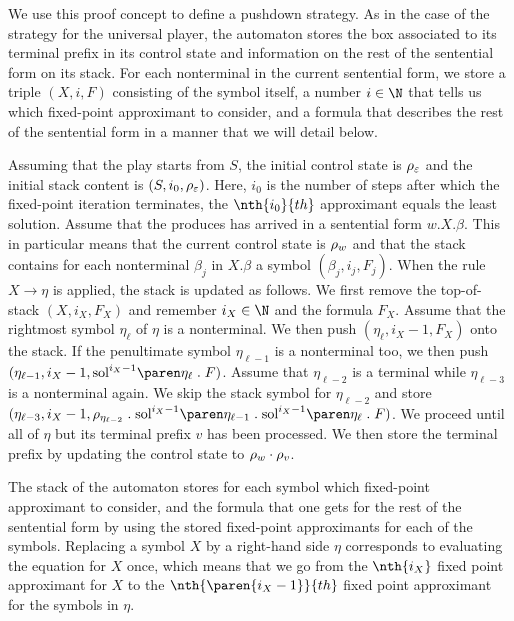 \documentclass[../../diss.tex]{subfiles}
\begin{document}
We use this proof concept to define a pushdown strategy.
As in the case of the strategy for the universal player, the automaton stores the box associated to its terminal prefix in its control state and information on the rest of the sentential form on its stack.
For each nonterminal in the current sentential form, we store a triple
\(
    (X, i, F)
\)
consisting of the symbol itself, a number $i \in \N$ that tells us which fixed-point approximant to consider, and a formula that describes the rest of the sentential form in a manner that we will detail below.

Assuming that the play starts from $S$, the initial control state is $\tbox{\eps}$ and the initial stack content is $(S,i_0,\tbox{\eps})$.
Here, $i_0$ is the number of steps after which the fixed-point iteration terminates, \ie the $\nth{i_0}{th}$ approximant equals the least solution.
Assume that the produces has arrived in a sentential form $w.X.\beta$.
This in particular means that the current control state is $\tbox{w}$ and that the stack contains for each nonterminal $\beta_j$ in $X.\beta$ a symbol $(\beta_j, i_j, F_j)$.
When the rule $X \to \eta$ is applied, the stack is updated as follows.
We first remove the top-of-stack $(X, i_X, F_X)$ and remember $i_X \in \N$ and the formula $F_X$.
Assume that the rightmost symbol $\eta_\ell$ of $\eta$ is a nonterminal.
We then push
$( \eta_\ell, i_X - 1, F_X)$ onto the stack.
If the penultimate symbol $\eta_{\ell - 1}$ is a nonterminal too, we then push
$( \eta_{\ell - 1}, i_X - 1, \sol{i_X - 1}{\eta_{\ell}} \comp F)$.
Assume that $\eta_{\ell - 2}$ is a terminal while $\eta_{\ell - 3}$ is a nonterminal again.
We skip the stack symbol for $\eta_{\ell - 2}$ and store
$( \eta_{\ell - 3}, i_X - 1, \tbox{\eta_{\ell - 2}} \comp \sol{i_X - 1}{\eta_{\ell - 1}} \comp \sol{i_X - 1}{\eta_{\ell}} \comp F)$.
We proceed until all of $\eta$ but its terminal prefix $v$ has been processed.
We then store the terminal prefix by updating the control state to $\tbox{w} \relcomp \tbox{v}$.

The stack of the automaton stores for each symbol which fixed-point approximant to consider, and the formula that one gets for the rest of the sentential form by using the stored fixed-point approximants for each of the symbols.
Replacing a symbol $X$ by a right-hand side $\eta$ corresponds to evaluating the equation for $X$ once, which means that we go from the $\nth{i_X}$ fixed point approximant for $X$ to the $\nth{\paren{i_X - 1}}{th}$ fixed point approximant for the symbols in $\eta$.
\end{document}
